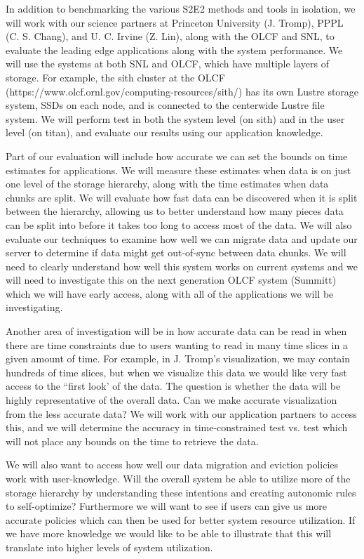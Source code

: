 In addition to benchmarking the various S2E2 methods and tools in isolation,
we will work with our science partners at Princeton University (J. Tromp),
PPPL (C. S. Chang), and U. C. Irvine (Z. Lin), along with the OLCF and SNL,
to evaluate the leading edge applications along with the system performance.
We will use the systems at both SNL and OLCF, which have multiple layers of
storage. For example, the sith cluster at the OLCF
(https://www.olcf.ornl.gov/computing-resources/sith/) has its own Lustre
storage system, SSDs on each node, and is connected to the centerwide Lustre
file system. We will perform test in both the system level (on sith) and in
the user level (on titan), and evaluate our results using our application
knowledge.

Part of our evaluation will include how accurate we can set the bounds on
time estimates for applications. We will measure these estimates when data
is on just one level of the storage hierarchy, along with the time estimates
when data chunks are split. We will evaluate how fast data can be discovered
when it is split between the hierarchy, allowing us to better understand how
many pieces data can be split into before it takes too long to access most
of the data. We will also evaluate our techniques to examine how well we can
migrate data and update our server to determine if data might get
out-of-sync between data chunks. We will need to clearly understand how well
this system works on current systems and we will need to investigate this on
the next generation OLCF system (Summitt) which we will have early access,
along with all of the applications we will be investigating.

Another area of investigation will be in how accurate data can be read in
when there are time constraints due to users wanting to read in many time
slices in a given amount of time. For example, in J. Tromp's visualization,
we may contain hundreds of time slices, but when we visualize this data we
would like very fast access to the ``first look' of the data. The question
is whether the data will be highly representative of the overall data. Can
we make accurate visualization from the less accurate data? We will work
with our application partners to access this, and we will determine the
accuracy in time-constrained test vs. test which will not place any bounds
on the time to retrieve the data.

We will also want to access how well our data migration and eviction
policies work with user-knowledge. Will the overall system be able to
utilize more of the storage hierarchy by understanding these intentions and
creating autonomic rules to self-optimize? Furthermore we will want to see
if users can give us more accurate policies which can then be used for
better system resource utilization. If we have more knowledge we would like
to be able to illustrate that this will translate into higher levels of
system utilization.

